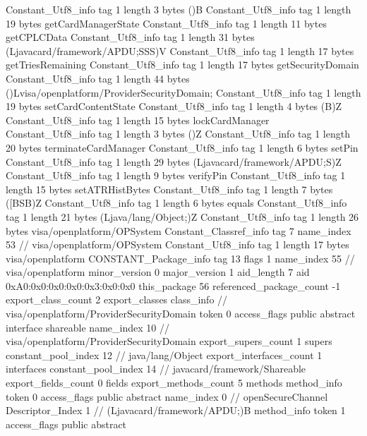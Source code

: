{{{		}
		Constant_Utf8_info {
			tag	1
			length	3
			bytes	()B
		}
		Constant_Utf8_info {
			tag	1
			length	19
			bytes	getCardManagerState
		}
		Constant_Utf8_info {
			tag	1
			length	11
			bytes	getCPLCData
		}
		Constant_Utf8_info {
			tag	1
			length	31
			bytes	(Ljavacard/framework/APDU;SSS)V
		}
		Constant_Utf8_info {
			tag	1
			length	17
			bytes	getTriesRemaining
		}
		Constant_Utf8_info {
			tag	1
			length	17
			bytes	getSecurityDomain
		}
		Constant_Utf8_info {
			tag	1
			length	44
			bytes	()Lvisa/openplatform/ProviderSecurityDomain;
		}
		Constant_Utf8_info {
			tag	1
			length	19
			bytes	setCardContentState
		}
		Constant_Utf8_info {
			tag	1
			length	4
			bytes	(B)Z
		}
		Constant_Utf8_info {
			tag	1
			length	15
			bytes	lockCardManager
		}
		Constant_Utf8_info {
			tag	1
			length	3
			bytes	()Z
		}
		Constant_Utf8_info {
			tag	1
			length	20
			bytes	terminateCardManager
		}
		Constant_Utf8_info {
			tag	1
			length	6
			bytes	setPin
		}
		Constant_Utf8_info {
			tag	1
			length	29
			bytes	(Ljavacard/framework/APDU;S)Z
		}
		Constant_Utf8_info {
			tag	1
			length	9
			bytes	verifyPin
		}
		Constant_Utf8_info {
			tag	1
			length	15
			bytes	setATRHistBytes
		}
		Constant_Utf8_info {
			tag	1
			length	7
			bytes	([BSB)Z
		}
		Constant_Utf8_info {
			tag	1
			length	6
			bytes	equals
		}
		Constant_Utf8_info {
			tag	1
			length	21
			bytes	(Ljava/lang/Object;)Z
		}
		Constant_Utf8_info {
			tag	1
			length	26
			bytes	visa/openplatform/OPSystem
		}
		Constant_Classref_info {
			tag	7
			name_index	53		// visa/openplatform/OPSystem
		}
		Constant_Utf8_info {
			tag	1
			length	17
			bytes	visa/openplatform
		}
		CONSTANT_Package_info {
			tag	13
			flags	1
			name_index	55		// visa/openplatform
			minor_version	0
			major_version	1
			aid_length	7
			aid	0xA0:0x0:0x0:0x0:0x3:0x0:0x0
		}
	}
	this_package	56
	referenced_package_count	-1
	export_class_count	2
	export_classes {
		class_info {		// visa/openplatform/ProviderSecurityDomain
			token	0
			access_flags	public abstract interface shareable
			name_index	10		// visa/openplatform/ProviderSecurityDomain
			export_supers_count	1
			supers {
				constant_pool_index	12		// java/lang/Object
			}
			export_interfaces_count	1
			interfaces {
				constant_pool_index	14		// javacard/framework/Shareable
			}
			export_fields_count	0
			fields {
			}
			export_methods_count	5
			methods {
				method_info {
					token	0
					access_flags	public abstract
					name_index	0		// openSecureChannel
					Descriptor_Index	1		// (Ljavacard/framework/APDU;)B
				}
				method_info {
					token	1
					access_flags	public abstract
}}}}}

